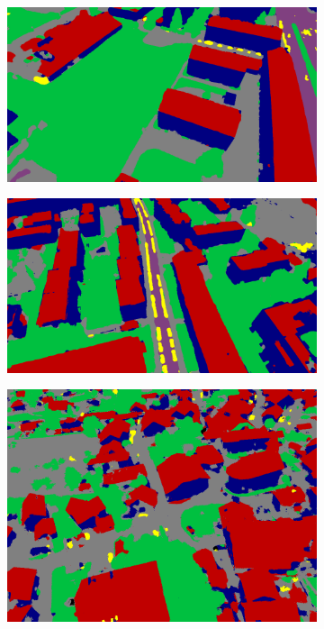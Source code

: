 \documentclass[remotesensing,article,accept,moreauthors,pdftex,10pt,a4paper]{mdpi}
\theoremstyle{mdpi}
\newcounter{ex}
\newcounter{re}
\begin{document}
\begin{figure}[H]
       \begin{subfigure}[tbp]{0.275\columnwidth}  
           \centering 
           \includegraphics[width=\textwidth]{segment/mil_seg1.png}
           \caption[]{}
           {{\small }}    
           \label{fig:4m}
       \end{subfigure}       
       \begin{subfigure}[tbp]{0.275\columnwidth}  
           \centering 
           \includegraphics[width=\textwidth]{segment/mil_seg2.png}
           \caption[]{}%
           {{\small }}    
           \label{fig:4n}
       \end{subfigure}
       \hfill
       \begin{subfigure}[tbp]{0.21\columnwidth}  
           \centering 
           \includegraphics[width=\textwidth]{segment/sullens_seg1.png}

\end{subfigure}
\end{figure}
\end{document}
